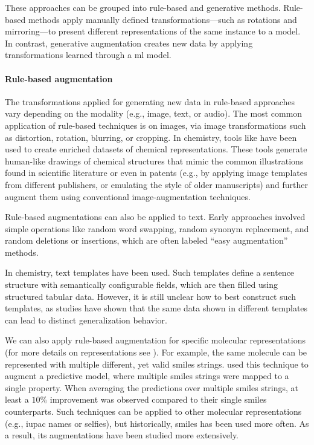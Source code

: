 These approaches can be grouped into rule-based and generative methods. 
Rule-based methods apply manually defined transformations---such as rotations and mirroring---to present different representations of the same instance to a model. 
In contrast, generative augmentation creates new data by applying transformations learned through a \gls{ml} model.

\paragraph{Rule-based augmentation} The transformations applied for generating new data in rule-based approaches vary depending on the modality (e.g., image, text, or audio).  
The most common application of rule-based techniques is on images, via image transformations such as distortion, rotation, blurring, or cropping.\autocite{shorten2019survey} 
In chemistry, tools like \autocite{brinkhaus2022randepict} have been used to create enriched datasets of chemical representations. 
These tools generate human-like drawings of chemical structures that mimic the common illustrations found in scientific literature or even in patents (e.g., by applying image templates from different publishers, or emulating the style of older manuscripts) and further augment them using conventional image-augmentation techniques.


Rule-based augmentations can also be applied to text. Early approaches involved simple operations like random word swapping, random synonym replacement, and random deletions or insertions, which are often labeled \enquote{easy augmentation} methods.\autocite{shorten2021text,wei2019eda0}

In chemistry, text templates have been used.\autocite{xie2023darwin,mirza2025chempile0, jablonka2024leveraging, vanherck2025assessment}  
Such templates define a sentence structure with semantically configurable fields, which are then filled using structured tabular data. 
However, it is still unclear how to best construct such templates, as studies have shown that the same data shown in different templates can lead to distinct generalization behavior.\autocite{gonzales2024evaluating} 

We can also apply rule-based augmentation for specific molecular representations (for more details on representations see ). 
For example, the same molecule can be represented with multiple different, yet valid \gls{smiles} strings. 
\textcite{bjerrum2017smiles} used this technique to augment a predictive model, where multiple \gls{smiles} strings were mapped to a single property. 
When averaging the predictions over multiple \gls{smiles} strings, at least a $10\%$ improvement was observed compared to their single \gls{smiles} counterparts. 
Such techniques can be applied to other molecular representations (e.g., \gls{iupac} names or \gls{selfies}), but historically, \gls{smiles} has been used more often. 
As a result, its augmentations have been studied more extensively.\autocite{kimber2021maxsmi,born2023chemical,arus2019randomized}

